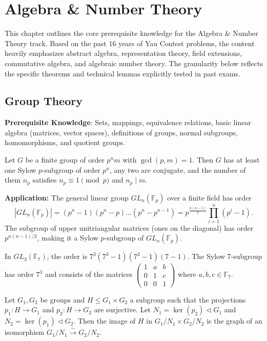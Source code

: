 \chapter{Algebra \& Number Theory}

This chapter outlines the core prerequisite knowledge for the Algebra \& Number Theory track. Based on the past 16 years of Yau Contest problems, the content heavily emphasizes abstract algebra, representation theory, field extensions, commutative algebra, and algebraic number theory. The granularity below reflects the specific theorems and technical lemmas explicitly tested in past exams.

\section{Group Theory}

\textbf{Prerequisite Knowledge}: Sets, mappings, equivalence relations, basic linear algebra (matrices, vector spaces), definitions of groups, normal subgroups, homomorphisms, and quotient groups.

\begin{theorem}
Let $G$ be a finite group of order $p^n m$ with $\gcd(p, m) = 1$. Then $G$ has at least one Sylow $p$-subgroup of order $p^n$, any two are conjugate, and the number of them $n_p$ satisfies $n_p \equiv 1 \pmod p$ and $n_p \mid m$.

\textbf{Application:} The general linear group $GL_n(\mathbb{F}_p)$ over a finite field has order
\[ |GL_n(\mathbb{F}_p)| = (p^n - 1)(p^n - p) \dots (p^n - p^{n-1}) = p^{\frac{n(n-1)}{2}} \prod_{i=1}^n (p^i - 1). \]
The subgroup of upper unitriangular matrices (ones on the diagonal) has order $p^{n(n-1)/2}$, making it a Sylow $p$-subgroup of $GL_n(\mathbb{F}_p)$.
\end{theorem}

\begin{example}
In $GL_3(\mathbb{F}_7)$, the order is $7^3 (7^3-1)(7^2-1)(7-1)$. The Sylow $7$-subgroup has order $7^3$ and consists of the matrices $\begin{pmatrix} 1 & a & b \\ 0 & 1 & c \\ 0 & 0 & 1 \end{pmatrix}$ where $a,b,c \in \mathbb{F}_7$.
\end{example}

\begin{theorem}
Let $G_1, G_2$ be groups and $H \le G_1 \times G_2$ a subgroup such that the projections $p_1: H \to G_1$ and $p_2: H \to G_2$ are surjective. Let $N_1 = \ker(p_2) \triangleleft G_1$ and $N_2 = \ker(p_1) \triangleleft G_2$. Then the image of $H$ in $G_1/N_1 \times G_2/N_2$ is the graph of an isomorphism $G_1/N_1 \xrightarrow{\sim} G_2/N_2$.
\end{theorem}

